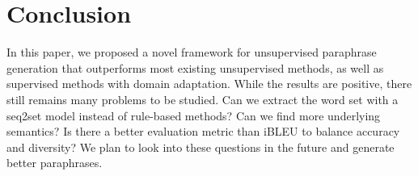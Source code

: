 \section{Conclusion}
In this paper, we proposed a novel framework for unsupervised paraphrase generation that outperforms most existing unsupervised methods, as well as supervised methods with domain adaptation. While the results are positive, there still remains many problems to be studied. Can we extract the word set with a seq2set model instead of rule-based methods? Can we find more underlying semantics? Is there a better evaluation metric than iBLEU to balance accuracy and diversity? We plan to look into these questions in the future and generate better paraphrases. 
